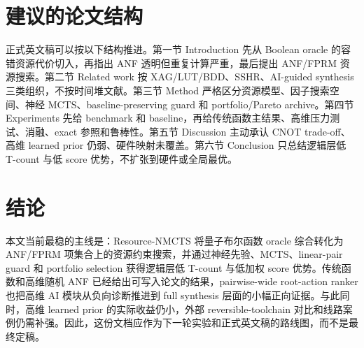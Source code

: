 \documentclass[UTF8,fontset=macnew,11pt]{ctexart}
\newcommand{\method}{Resource-NMCTS}
\begin{document}
\section{建议的论文结构}

正式英文稿可以按以下结构推进。第一节 Introduction 先从 Boolean oracle 的容错资源代价切入，再指出 ANF 透明但重复计算严重，最后提出 ANF/FPRM 资源搜索。第二节 Related work 按 XAG/LUT/BDD、SSHR、AI-guided synthesis 三类组织，不按时间堆文献。第三节 Method 严格区分资源模型、因子搜索空间、神经 MCTS、baseline-preserving guard 和 portfolio/Pareto archive。第四节 Experiments 先给 benchmark 和 baseline，再给传统函数主结果、高维压力测试、消融、exact 参照和鲁棒性。第五节 Discussion 主动承认 CNOT trade-off、高维 learned prior 仍弱、硬件映射未覆盖。第六节 Conclusion 只总结逻辑层低 T-count 与低 score 优势，不扩张到硬件或全局最优。

\section{结论}

本文当前最稳的主线是：\method{} 将量子布尔函数 oracle 综合转化为 ANF/FPRM 项集合上的资源约束搜索，并通过神经先验、MCTS、linear-pair guard 和 portfolio selection 获得逻辑层低 T-count 与低加权 score 优势。传统函数和高维随机 ANF 已经给出可写入论文的结果，pairwise-wide root-action ranker 也把高维 AI 模块从负向诊断推进到 full synthesis 层面的小幅正向证据。与此同时，高维 learned prior 的实际收益仍小，外部 reversible-toolchain 对比和线路案例仍需补强。因此，这份文档应作为下一轮实验和正式英文稿的路线图，而不是最终定稿。
\end{document}

